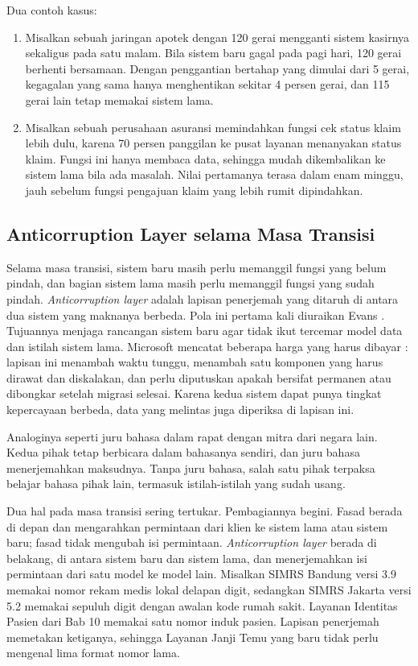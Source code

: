 Dua contoh kasus:
\begin{enumerate}
  \item Misalkan sebuah jaringan apotek dengan 120 gerai mengganti sistem kasirnya sekaligus pada
        satu malam. Bila sistem baru gagal pada pagi hari, 120 gerai berhenti bersamaan. Dengan
        penggantian bertahap yang dimulai dari 5 gerai, kegagalan yang sama hanya menghentikan
        sekitar 4 persen gerai, dan 115 gerai lain tetap memakai sistem lama.
  \item Misalkan sebuah perusahaan asuransi memindahkan fungsi cek status klaim lebih dulu, karena
        70 persen panggilan ke pusat layanan menanyakan status klaim. Fungsi ini hanya membaca data,
        sehingga mudah dikembalikan ke sistem lama bila ada masalah. Nilai pertamanya terasa dalam
        enam minggu, jauh sebelum fungsi pengajuan klaim yang lebih rumit dipindahkan.
\end{enumerate}

\subsection{Anticorruption Layer selama Masa Transisi}

Selama masa transisi, sistem baru masih perlu memanggil fungsi yang belum pindah, dan bagian sistem
lama masih perlu memanggil fungsi yang sudah pindah. \textit{Anticorruption layer} adalah lapisan
penerjemah yang ditaruh di antara dua sistem yang maknanya berbeda. Pola ini pertama kali
diuraikan Evans \cite{evans2003}. Tujuannya menjaga rancangan sistem baru agar tidak ikut tercemar
model data dan istilah sistem lama. Microsoft mencatat beberapa harga yang harus dibayar
\cite{c14-azure-acl}: lapisan ini menambah waktu tunggu, menambah satu komponen yang harus dirawat
dan diskalakan, dan perlu diputuskan apakah bersifat permanen atau dibongkar setelah migrasi selesai.
Karena kedua sistem dapat punya tingkat kepercayaan berbeda, data yang melintas juga diperiksa di
lapisan ini.

Analoginya seperti juru bahasa dalam rapat dengan mitra dari negara lain. Kedua pihak tetap berbicara
dalam bahasanya sendiri, dan juru bahasa menerjemahkan maksudnya. Tanpa juru bahasa, salah satu
pihak terpaksa belajar bahasa pihak lain, termasuk istilah-istilah yang sudah usang.

Dua hal pada masa transisi sering tertukar. Pembagiannya begini. Fasad berada di depan dan
mengarahkan permintaan dari klien ke sistem lama atau sistem baru; fasad tidak mengubah isi
permintaan. \textit{Anticorruption layer} berada di belakang, di antara sistem baru dan sistem lama,
dan menerjemahkan isi permintaan dari satu model ke model lain. Misalkan SIMRS Bandung versi 3.9
memakai nomor rekam medis lokal delapan digit, sedangkan SIMRS Jakarta versi 5.2 memakai sepuluh
digit dengan awalan kode rumah sakit. Layanan Identitas Pasien dari Bab 10 memakai satu nomor induk
pasien. Lapisan penerjemah memetakan ketiganya, sehingga Layanan Janji Temu yang baru tidak perlu
mengenal lima format nomor lama.

